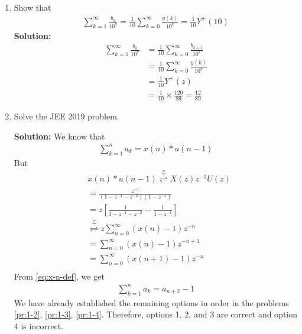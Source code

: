 \documentclass[journal,12pt,twocolumn]{IEEEtran}
\newcommand{\solution}{\noindent \textbf{Solution: }}
\providecommand{\brak}[1]{\ensuremath{\left(#1\right)}}
\providecommand{\sbrak}[1]{\ensuremath{\left[#1\right]}}
\providecommand{\ztrans}{\overset{\mathcal{Z}}{ \rightleftharpoons}}
\numberwithin{equation}{section}
\renewcommand\thesection{\arabic{section}}
\begin{document}
\begin{enumerate}[label=\thesection.\arabic*,ref=\thesection.\theenumi]
\solution Putting $n = k + 1$ in \eqref{eq:yn-exp} and using the definition of $u(n)$, 
\begin{align}
\alpha^n + \beta^n = \brak{\alpha^{k + 1} + \beta^{k + 1}}u(k)
\end{align}
Hence, \eqref{eq:yn-exp} can be expressed as
\begin{align}
w(n) = \brak{\alpha^{n+1} + \beta^{n+1}}u(n) = y(n)
\end{align}
Therefore,
\begin{align}
    W(z) = Y(z) = \frac{1 + 2z^{-1}}{1 - z^{-1} - z^{-2}}
\end{align}
 \item Show that 
\begin{align}
	\sum_{k=1}^{\infty}\frac{b_k}{10^k} =
	\frac{1}{10}\sum_{k=0}^{\infty}\frac{y\brak{k}}{10^k} =\frac{1}{10}Y^{+}\brak{{10}}
\end{align}
\label{pr:1-4}
\solution
\begin{align}
    \sum_{k=1}^{\infty}\frac{b_k}{10^k} &= \frac{1}{10}\sum_{k = 0}^{\infty}\frac{b_{k+1}}{10^k} \\
                                        &= \frac{1}{10}\sum_{k = 0}^{\infty}\frac{y(k)}{10^k} \\
                                        &= \frac{1}{10}Y^+(z) \\
                                        &= \frac{1}{10}\times\frac{120}{89} = \frac{12}{89}
\end{align}
\item Solve the JEE 2019 problem.

\solution We know that
\begin{align}
    \sum_{k = 1}^{n}a_k = x(n)*u(n - 1)
\end{align}
But
\begin{align}
    &x(n)*u(n - 1) \ztrans X(z)z^{-1}U(z) \\
    &= \frac{z^{-1}}{\brak{1 - z^{-1} - z^{-2}}\brak{1 - z^{-1}}} \\
    &= z\sbrak{\frac{1}{1 - z^{-1} - z^{-2}} - \frac{1}{1 - z^{-1}}} \\
    &\ztrans z\sum_{n = 0}^{\infty}\brak{x(n) - 1}z^{-n} \\
    &= \sum_{n = 0}^{\infty}\brak{x(n) - 1}z^{-n + 1} \\
    &= \sum_{n = 0}^{\infty}\brak{x(n + 1) - 1}z^{-n} \\
\end{align}
From \eqref{eq:x-n-def}, we get
\begin{align}
    \sum_{k = 1}^{n}a_k = a_{n+2} - 1
\end{align}
We have already established the remaining options in order in the problems
\eqref{pr:1-2}, \eqref{pr:1-3}, \eqref{pr:1-4}. Therefore, options 1, 2,
and 3 are correct and option 4 is incorrect.
\end{enumerate}
\end{document}
